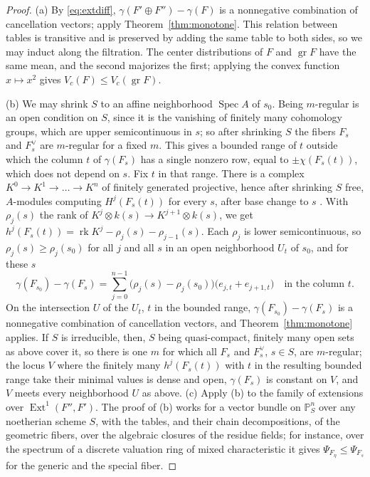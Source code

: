 \documentclass[11pt]{amsart}
\theoremstyle{definition}
\theoremstyle{remark}
\newcommand{\PP}{\mathbb{P}}
\DeclareMathOperator{\rk}{rk}
\DeclareMathOperator{\gr}{gr}
\DeclareMathOperator{\Ext}{Ext}
\begin{document}
\begin{proof}
(a) By \eqref{eq:extdiff}, $\gamma(F'\oplus F'')-\gamma(F)$ is a nonnegative combination of cancellation vectors; apply Theorem~\ref{thm:monotone}. This relation between tables is transitive and is preserved by adding the same table to both sides, so we may induct along the filtration. The center distributions of $F$ and $\gr F$ have the same mean, and the second majorizes the first; applying the convex function $x\mapsto x^2$ gives $V_c(F)\le V_c(\gr F)$.

(b) We may shrink $S$ to an affine neighborhood $\operatorname{Spec}A$ of $s_0$. Being $m$-regular is an open condition on $S$, since it is the vanishing of finitely many cohomology groups, which are upper semicontinuous in $s$; so after shrinking $S$ the fibers $F_s$ and $F_s^\vee$ are $m$-regular for a fixed $m$. This gives a bounded range of $t$ outside which the column $t$ of $\gamma(F_s)$ has a single nonzero row, equal to $\pm\chi(F_s(t))$, which does not depend on $s$. Fix $t$ in that range. There is a complex $K^0\to K^1\to\dots\to K^n$ of finitely generated projective, hence after shrinking $S$ free, $A$-modules computing $H^j(F_s(t))$ for every $s$, after base change to $s$ \cite[Ch.~II, \S5]{Mu70}. With $\rho_j(s)$ the rank of $K^j\otimes k(s)\to K^{j+1}\otimes k(s)$, we get $h^j(F_s(t))=\rk K^j-\rho_j(s)-\rho_{j-1}(s)$. Each $\rho_j$ is lower semicontinuous, so $\rho_j(s)\ge\rho_j(s_0)$ for all $j$ and all $s$ in an open neighborhood $U_t$ of $s_0$, and for these $s$
\[
\gamma(F_{s_0})-\gamma(F_s)=\sum_{j=0}^{n-1}\big(\rho_j(s)-\rho_j(s_0)\big)\big(e_{j,t}+e_{j+1,t}\big)\quad\text{in the column }t .
\]
On the intersection $U$ of the $U_t$, $t$ in the bounded range, $\gamma(F_{s_0})-\gamma(F_s)$ is a nonnegative combination of cancellation vectors, and Theorem~\ref{thm:monotone} applies. If $S$ is irreducible, then, $S$ being quasi-compact, finitely many open sets as above cover it, so there is one $m$ for which all $F_s$ and $F_s^\vee$, $s\in S$, are $m$-regular; the locus $V$ where the finitely many $h^j(F_s(t))$ with $t$ in the resulting bounded range take their minimal values is dense and open, $\gamma(F_s)$ is constant on $V$, and $V$ meets every neighborhood $U$ as above. (c) Apply (b) to the family of extensions over $\Ext^1(F'',F')$. The proof of (b) works for a vector bundle on $\PP^n_S$ over any noetherian scheme $S$, with the tables, and their chain decompositions, of the geometric fibers, over the algebraic closures of the residue fields; for instance, over the spectrum of a discrete valuation ring of mixed characteristic it gives $\Psi_{F_\eta}\le\Psi_{F_s}$ for the generic and the special fiber.
\end{proof}
\end{document}
